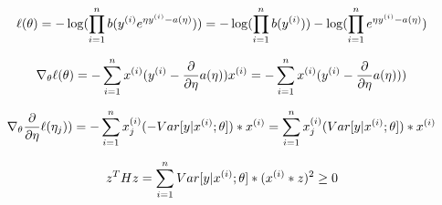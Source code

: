 \begin{answer}

\begin{equation*}
\ell(\theta) = - \log(\prod_{i=1}^{n} b(y^{(i)} e^{\eta y^{(i)} - a(\eta)})) = - \log(\prod_{i=1}^{n} b(y^{(i)})) - \log(\prod_{i=1}^{n} e^{\eta y^{(i)} - a(\eta)}) 
\end{equation*}

\begin{equation*}
\nabla_\theta \ell(\theta) = - \sum_{i=1}^{n} x^{(i)} (y^{(i)} - \frac{\partial}{\partial\eta}a(\eta)) x^{(i)} = - \sum_{i=1}^{n} x^{(i)} (y^{(i)} - \frac{\partial}{\partial\eta}a(\eta)))
\end{equation*}

\begin{equation*}
\nabla_\theta \frac{\partial}{\partial\eta}\ell(\eta_{j})) = - \sum_{i=1}^{n} x_{j}^{(i)} (-Var[y|x^{(i)}; \theta]) * x^{(i)} = \sum_{i=1}^{n} x_{j}^{(i)} (Var[y|x^{(i)}; \theta]) * x^{(i)}
\end{equation*}


\begin{equation*}
z^THz = \sum_{i=1}^{n} Var[y|x^{(i)}; \theta] * (x^{(i)}*z)^{2} \ge 0
\end{equation*}



\end{answer}
